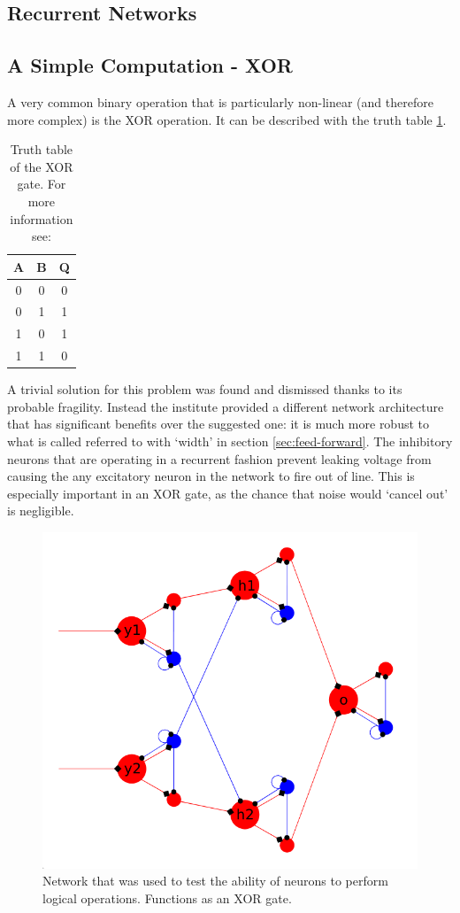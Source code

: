 \documentclass[10pt,a4paper]{article}
\begin{document}
\subsection{Recurrent Networks}

\subsection{A Simple Computation - XOR}
A very common binary operation that is particularly non-linear (and therefore
more complex) is the XOR operation. It can be described with the truth table
\ref{tab:XOR}.
\begin{table}
    \centering
    \begin{tabular}{c | c | c}
        A & B & Q \\ \hline
        0 & 0 & 0 \\
        0 & 1 & 1 \\
        1 & 0 & 1 \\
        1 & 1 & 0
    \end{tabular}
    \caption{Truth table of the XOR gate. For more information see:
    \cite{horowitz_hill_2020}}
    \label{tab:XOR}
\end{table}
A trivial solution for this problem was found and dismissed thanks to its
probable fragility.  Instead the institute provided a different network
architecture that has significant benefits over the suggested one: it is much
more robust to what is called referred to with `width' in section
\ref{sec:feed-forward}. The inhibitory neurons that are operating in a recurrent
fashion prevent leaking voltage from causing the any excitatory neuron in the
network to fire out of line. This is especially important in an XOR gate, as the
chance that noise would `cancel out' is negligible.

\begin{figure}
    \centering
    \includegraphics[width=.5\textwidth]{figures/XOR-used.png}
    \caption{Network that was used to test the ability of neurons to perform
        logical operations. Functions as an XOR gate.}
    \label{fig:XOR-used}
\end{figure}
\end{document}
